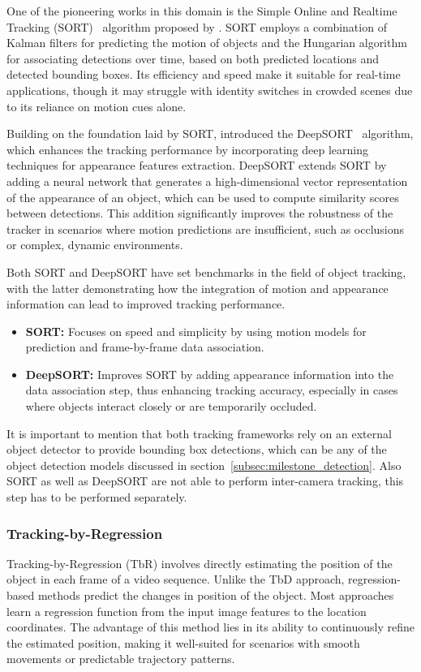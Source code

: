 One of the pioneering works in this domain is the Simple Online and Realtime Tracking (SORT)~\cite{Bewley16} algorithm proposed by \citeauthor{Bewley16}. SORT employs a combination of Kalman filters for predicting the motion of objects and the Hungarian algorithm for associating detections over time, based on both predicted locations and detected bounding boxes. Its efficiency and speed make it suitable for real-time applications, though it may struggle with identity switches in crowded scenes due to its reliance on motion cues alone.

Building on the foundation laid by SORT, \citeauthor{Wojke17} introduced the DeepSORT~\cite{Wojke17} algorithm, which enhances the tracking performance by incorporating deep learning techniques for appearance features extraction. DeepSORT extends SORT by adding a neural network that generates a high-dimensional vector representation of the appearance of an object, which can be used to compute similarity scores between detections. This addition significantly improves the robustness of the tracker in scenarios where motion predictions are insufficient, such as occlusions or complex, dynamic environments.

Both SORT and DeepSORT have set benchmarks in the field of object tracking, with the latter demonstrating how the integration of motion and appearance information can lead to improved tracking performance.

\begin{itemize}
    \item \textbf{SORT:} Focuses on speed and simplicity by using motion models for prediction and frame-by-frame data association.
    \item \textbf{DeepSORT:} Improves SORT by adding appearance information into the data association step, thus enhancing tracking accuracy, especially in cases where objects interact closely or are temporarily occluded.
\end{itemize}

It is important to mention that both tracking frameworks rely on an external object detector to provide bounding box detections, which can be any of the object detection models discussed in section~\ref{subsec:milestone_detection}. Also SORT as well as DeepSORT are not able to perform inter-camera tracking, this step has to be performed separately.

\subsubsection{Tracking-by-Regression}\label{subsubsec:tracking-by-regression}
Tracking-by-Regression (TbR) involves directly estimating the position of the object in each frame of a video sequence. Unlike the TbD approach, regression-based methods predict the changes in position of the object. Most approaches learn a regression function from the input image features to the location coordinates. The advantage of this method lies in its ability to continuously refine the estimated position, making it well-suited for scenarios with smooth movements or predictable trajectory patterns.

